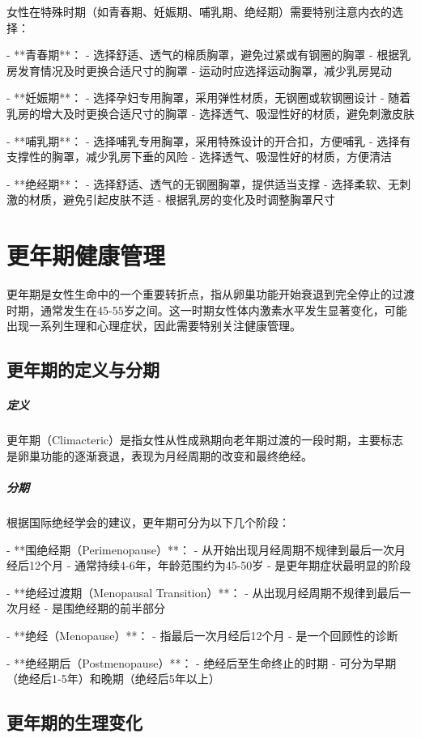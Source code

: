 \begin{enumerate}
女性在特殊时期（如青春期、妊娠期、哺乳期、绝经期）需要特别注意内衣的选择：

- **青春期**：
  - 选择舒适、透气的棉质胸罩，避免过紧或有钢圈的胸罩
  - 根据乳房发育情况及时更换合适尺寸的胸罩
  - 运动时应选择运动胸罩，减少乳房晃动

- **妊娠期**：
  - 选择孕妇专用胸罩，采用弹性材质，无钢圈或软钢圈设计
  - 随着乳房的增大及时更换合适尺寸的胸罩
  - 选择透气、吸湿性好的材质，避免刺激皮肤

- **哺乳期**：
  - 选择哺乳专用胸罩，采用特殊设计的开合扣，方便哺乳
  - 选择有支撑性的胸罩，减少乳房下垂的风险
  - 选择透气、吸湿性好的材质，方便清洁

- **绝经期**：
  - 选择舒适、透气的无钢圈胸罩，提供适当支撑
  - 选择柔软、无刺激的材质，避免引起皮肤不适
  - 根据乳房的变化及时调整胸罩尺寸

\section{更年期健康管理}

更年期是女性生命中的一个重要转折点，指从卵巢功能开始衰退到完全停止的过渡时期，通常发生在45-55岁之间。这一时期女性体内激素水平发生显著变化，可能出现一系列生理和心理症状，因此需要特别关注健康管理。

\subsection{更年期的定义与分期}

\subparagraph{定义}
更年期（Climacteric）是指女性从性成熟期向老年期过渡的一段时期，主要标志是卵巢功能的逐渐衰退，表现为月经周期的改变和最终绝经。

\subparagraph{分期}
根据国际绝经学会的建议，更年期可分为以下几个阶段：

- **围绝经期（Perimenopause）**：
  - 从开始出现月经周期不规律到最后一次月经后12个月
  - 通常持续4-6年，年龄范围约为45-50岁
  - 是更年期症状最明显的阶段

- **绝经过渡期（Menopausal Transition）**：
  - 从出现月经周期不规律到最后一次月经
  - 是围绝经期的前半部分

- **绝经（Menopause）**：
  - 指最后一次月经后12个月
  - 是一个回顾性的诊断

- **绝经期后（Postmenopause）**：
  - 绝经后至生命终止的时期
  - 可分为早期（绝经后1-5年）和晚期（绝经后5年以上）

\subsection{更年期的生理变化}


\end{enumerate}
